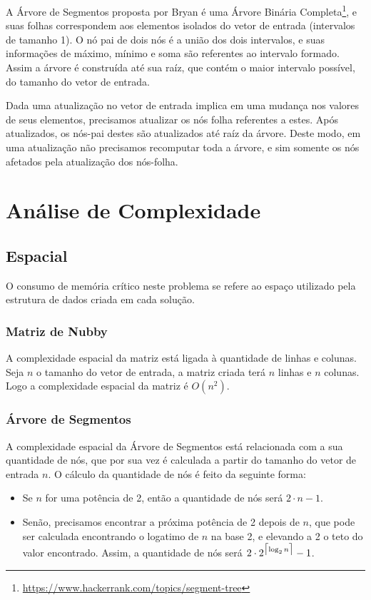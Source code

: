 \documentclass{article}
\DeclarePairedDelimiter{\ceil}{\lceil}{\rceil}
\begin{document}
A Árvore de Segmentos proposta por Bryan é uma Árvore Binária Completa\footnote{\url{https://www.hackerrank.com/topics/segment-tree}}, e suas folhas correspondem aos elementos isolados do vetor de entrada (intervalos de tamanho 1). O nó pai de dois nós é a união dos dois intervalos, e suas informações de máximo, mínimo e soma são referentes ao intervalo formado. Assim a árvore é construída até sua raíz, que contém o maior intervalo possível, do tamanho do vetor de entrada.

Dada uma atualização no vetor de entrada implica em uma mudança nos valores de seus elementos, precisamos atualizar os nós folha referentes a estes. Após atualizados, os nós-pai destes são atualizados até raíz da árvore. Deste modo, em uma atualização não precisamos recomputar toda a árvore, e sim somente os nós afetados pela atualização dos nós-folha.

\section{Análise de Complexidade}

\subsection{Espacial}

O consumo de memória crítico neste problema se refere ao espaço utilizado pela estrutura de dados criada em cada solução.

\subsubsection{Matriz de Nubby}

A complexidade espacial da matriz está ligada à quantidade de linhas e colunas. Seja $n$ o tamanho do vetor de entrada, a matriz criada terá $n$ linhas e $n$ colunas. Logo a complexidade espacial da matriz é $O(n^2)$.

\subsubsection{Árvore de Segmentos}

A complexidade espacial da Árvore de Segmentos está relacionada com a sua quantidade de nós, que por sua vez é calculada a partir do tamanho do vetor de entrada $n$. O cálculo da quantidade de nós é feito da seguinte forma:

\begin{itemize}
\item Se $n$ for uma potência de 2, então a quantidade de nós será $2 \cdot n - 1$.
\item Senão, precisamos encontrar a próxima potência de 2 depois de $n$, que pode ser calculada encontrando o logatimo de $n$ na base 2, e elevando a 2 o teto do valor encontrado. Assim, a quantidade de nós será $2 \cdot 2^{\ceil[\big]{\log_2 n}} - 1$.
\end{itemize}
\end{document}
